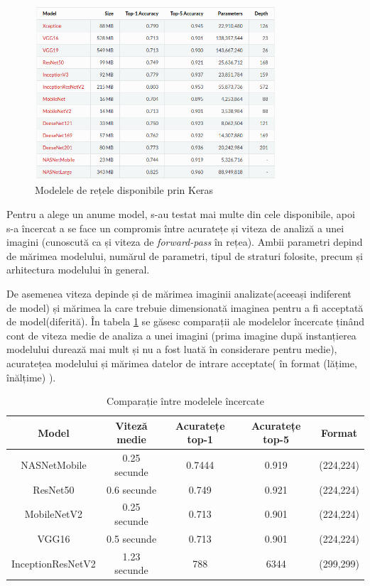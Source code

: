 \begin{figure}[!htbp]
    \begin{center}
        \includegraphics[width=0.8\textwidth]{images/neuralnetworks.png}
        \caption{Modelele de rețele disponibile prin Keras\label{fig:networks}}
    \end{center}
\end{figure}

Pentru a alege un anume model, s-au testat mai multe din cele disponibile, apoi s-a încercat a se face un compromis între acuratețe și viteza de analiză a unei imagini (cunoscută ca și viteza de \textit{forward-pass} în rețea). Ambii parametri depind de mărimea modelului, numărul de parametri, tipul de straturi folosite, precum și arhitectura modelului în general.

De asemenea viteza depinde și de mărimea imaginii analizate(aceeași indiferent de model) și mărimea la care trebuie dimensionată imaginea pentru a fi acceptată de model(diferită). În tabela \ref{table:1} se găsesc comparații ale modelelor încercate ținând cont de viteza medie de analiza a unei imagini (prima imagine după instanțierea modelului durează mai mult și nu a fost luată în considerare pentru medie), acuratețea modelului și mărimea datelor de intrare acceptate( în format (lățime, înălțime) ).


\begin{table}[ht!]
\centering
 \begin{tabular}{||c c c c c||} 
 \hline
 Model & Viteză medie & Acuratețe top-1 & Acuratețe top-5 & Format \\ [0.5ex] 
 \hline\hline
 NASNetMobile & 0.25 secunde & 0.7444 & 0.919 &(224,224) \\ 
 \hline
 ResNet50 & 0.6 secunde & 0.749 & 0.921 & (224,224) \\
 \hline
 MobileNetV2 & 0.25 secunde & 0.713 & 0.901 & (224,224) \\
 \hline
 VGG16 & 0.5 secunde & 0.713 & 0.901 & (224,224)  \\
 \hline
 InceptionResNetV2 & 1.23 secunde & 788 & 6344 &  (299,299) \\ [1ex] 
 \hline
\end{tabular}
\caption{Comparație între modelele încercate}
\label{table:1}
\end{table}

